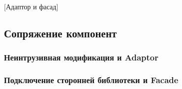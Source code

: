 [Адаптор и фасад]


\subsection{Сопряжение компонент}

\subsubsection{Неинтрузивная модификация и Adaptor}
\label{section::Adaptors}

\subsubsection{Подключение сторонней библиотеки и
Facade}
\label{section::Facades}
